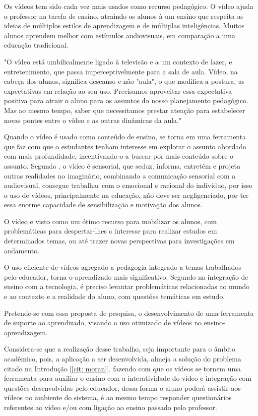 \par
Os vídeos tem sido cada vez mais usados como recurso pedagógico. O vídeo ajuda o professor na tarefa de ensino, atraindo os alunos à um ensino que respeita as ideias de múltiplos estilos de aprendizagem e de múltiplas inteligências. Muitos alunos aprendem melhor com estímulos audiovisuais, em comparação a uma educação tradicional.
\par
\begin{citacao}
  \label{cit: moran}
  "O vídeo está umbilicalmente ligado à televisão e a um contexto de lazer, e entretenimento, que passa imperceptivelmente para a sala de aula. Vídeo, na cabeça dos alunos, significa descanso e não "aula", o que modifica a postura, as expectativas em relação ao seu uso. Precisamos aproveitar essa expectativa positiva para atrair o aluno para os assuntos do nosso planejamento pedagógico. Mas ao mesmo tempo, saber que necessitamos prestar atenção para estabelecer novas pontes entre o vídeo e as outras dinâmicas da aula." \cite{moran}
\end{citacao}
\par
Quando o vídeo é usado como conteúdo de ensino, se torna em uma ferramenta que faz com que o estudantes tenham interesse em explorar o assunto abordado com mais profundidade, incentivando-o a buscar por mais conteúdo sobre o assunto. Segundo \cite{moran}, o vídeo é sensorial, que seduz, informa, entretém e projeta outras realidades no imaginário, combinando a comunicação sensorial com a audiovisual, consegue trabalhar com o emocional e racional do individuo, por isso o uso de vídeos, principalmente na educação, não deve ser negligenciado, por ter essa enorme capacidade de sensibilização e motivação dos alunos.
\par
O vídeo e visto como um ótimo recurso para mobilizar os alunos, com problemáticas para despertar-lhes o interesse para realizar estudos em determinados temas, ou até trazer novas perspectivas para investigações em andamento.
\par
O uso eficiente de vídeos agregado a pedagogia integrado a temas trabalhados pelo educador, torna o aprendizado mais significativo. Segundo \cite{almeida} na integração de ensino com a tecnologia, é preciso levantar problemáticas relacionadas ao mundo e ao contexto e a realidade do aluno, com questões temáticas em estudo. 
\par
Pretende-se com essa proposta de pesquisa, o desenvolvimento de uma ferramenta de suporte ao aprendizado, visando o uso otimizado de vídeos no ensino-aprendizagem.
\par
Considera-se que a realização desse trabalho, seja importante para o âmbito acadêmico, pois, a aplicação a ser desenvolvida, almeja a solução do problema citado na Introdução [\ref{cit: moran}], fazendo com que os vídeos se tornem uma ferramenta para auxiliar o ensino com a interatividade do vídeo e integração com questões desenvolvidas pelo educador, dessa forma o aluno poderá assistir aos vídeos no ambiente do sistema, é ao mesmo tempo responder questionários referentes ao vídeo e/ou com ligação ao ensino passado pelo professor.

